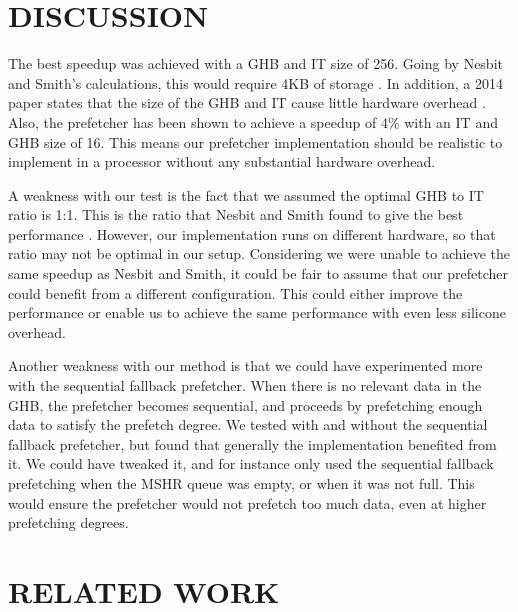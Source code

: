 \documentclass[conference]{IEEEtran}
\begin{document}

\section{DISCUSSION}

The best speedup was achieved with a GHB and IT size of 256. Going by Nesbit and Smith's calculations, this would require 4KB of storage \cite{b1}. In addition, a 2014 paper states that the size of the GHB and IT cause little hardware overhead \cite{falsafi}. Also, the prefetcher has been shown to achieve a speedup of 4\% with an IT and GHB size of 16. This means our prefetcher implementation should be realistic to implement in a processor without any substantial hardware overhead. 

A weakness with our test is the fact that we assumed the optimal GHB to IT ratio is 1:1. This is the ratio that Nesbit and Smith found to give the best performance \cite{b1}. However, our implementation runs on different hardware, so that ratio may not be optimal in our setup. Considering we were unable to achieve the same speedup as Nesbit and Smith, it could be fair to assume that our prefetcher could benefit from a different configuration. This could either improve the performance or enable us to achieve the same performance with even less silicone overhead.

Another weakness with our method is that we could have experimented more with the sequential fallback prefetcher. When there is no relevant data in the GHB, the prefetcher becomes sequential, and proceeds by prefetching enough data to satisfy the prefetch degree. We tested with and without the sequential fallback prefetcher, but found that generally the implementation benefited from it. We could have tweaked it, and for instance only used the sequential fallback prefetching when the MSHR queue was empty, or when it was not full. This would ensure the prefetcher would not prefetch too much data, even at higher prefetching degrees. 


\section{RELATED WORK}

\end{document}
